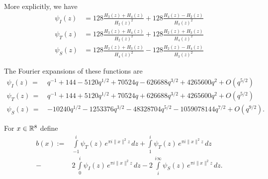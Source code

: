 \begin{lemma}\label{lemma: psi I psi T psi S explicit}
More explicitly, we have
\begin{align}
    \psi_I(z) &= 128 \frac{H_3(z) + H_4(z)}{H_2(z)^2} + 128 \frac{H_4(z) - H_2(z)}{H_3(z)^2} \label{eqn: psi I explicit} \\
    \psi_T(z) &= 128 \frac{H_3(z) + H_4(z)}{H_2(z)^2} + 128 \frac{H_2(z) + H_3(z)}{H_4(z)^2} \label{eqn: psi T explicit} \\
    \psi_S(z) &= 128 \frac{H_2(z) + H_3(z)}{H_4(z)^2} - 128 \frac{H_2(z) - H_4(z)}{H_3(z)^2} \label{eqn: psi S explicit}
\end{align}
\end{lemma}
\begin{lemma}\label{lemma: psi fourier I psi fourier T psi fourier S}
The Fourier expansions of these functions are
\begin{align}
    \psi_I(z)\,=\,&q^{-1} + 144 - 5120 q^{1/2} + 70524 q - 626688 q^{3/2} + 4265600 q^2    + O(q^{5/2}) \label{eqn: psi fourier I}\\
    \psi_T(z)\,=\,&q^{-1} + 144 + 5120 q^{1/2} + 70524 q + 626688 q^{3/2} + 4265600 q^2    + O(q^{5/2}) \label{eqn: psi fourier T}\\
    \psi_S(z)\,=\,&-10240 q^{1/2} - 1253376 q^{3/2} - 48328704 q^{5/2} - 1059078144 q^{7/2}+O(q^{9/2}).\label{eqn: psi fourier S}
\end{align}
\end{lemma}
\begin{definition}\label{def:b-definition}
For $x\in\mathbb{R}^8$ define
\begin{align}\label{eqn:b-definition}
    b(x):= & \int\limits_{-1}^{i}\psi_T(z)\,e^{\pi i \|x\|^2 z}\,dz
        + \int\limits_{1}^{i}\psi_T(z)\,e^{\pi i \|x\|^2 z}\,dz \\
    -& 2\,\int\limits_{0}^{i}\psi_I(z)\,e^{\pi i \|x\|^2 z}\,dz
    - 2\,\int\limits_{i}^{i\infty}\psi_S(z)\,e^{\pi i \|x\|^2 z}\,dz \nonumber.
\end{align}
\end{definition}

